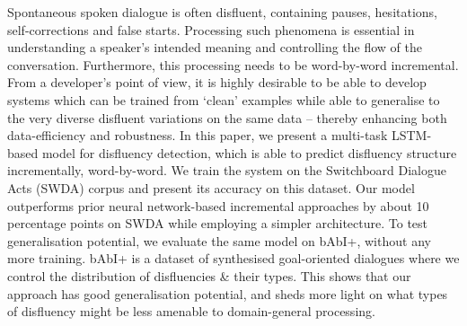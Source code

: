Spontaneous spoken dialogue is often disfluent, containing pauses, hesitations, self-corrections and false starts. Processing such phenomena is essential in understanding a speaker's intended meaning and controlling the flow of the conversation. Furthermore, this processing needs to be word-by-word incremental. From a developer's point of view, it is highly desirable to be able to develop systems which can be trained from `clean' examples while able to generalise to the very diverse disfluent variations on the same data -- thereby enhancing both data-efficiency and robustness. In this paper, we present a multi-task LSTM-based model for disfluency detection, which is able to predict disfluency structure incrementally, word-by-word. We train the system on the Switchboard Dialogue Acts (SWDA) corpus and present its accuracy on this dataset. Our model outperforms prior neural network-based incremental approaches by about 10 percentage points on SWDA while employing a simpler architecture. To test generalisation potential, we evaluate the same model on bAbI+, without any more training. bAbI+ is a dataset of synthesised goal-oriented dialogues where we control the distribution of disfluencies \& their types. This shows that our approach has good generalisation potential, and sheds more light on what types of disfluency might be less amenable to domain-general processing.
